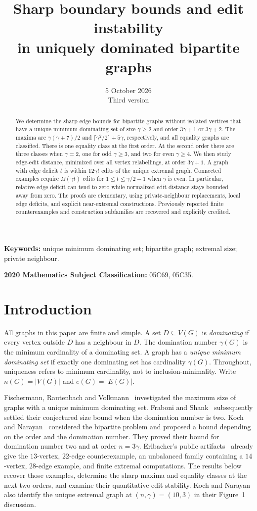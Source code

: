 \documentclass[11pt]{article}
\title{Sharp boundary bounds and edit instability\\in uniquely dominated bipartite graphs}
\author{}
\date{5 October 2026\\\small Third version}
\theoremstyle{definition}
\theoremstyle{remark}
\newcommand{\e}{e}
\begin{document}
\maketitle
\begin{abstract}
We determine the sharp edge bounds for bipartite graphs without isolated
vertices that have a unique minimum dominating set of size $\gamma\ge2$ and
order $3\gamma+1$ or $3\gamma+2$. The maxima are $\gamma(\gamma+7)/2$ and
$\lceil\gamma^2/2\rceil+5\gamma$, respectively, and all equality graphs are
classified. There is one equality class at the first order. At the second
order there are three classes when $\gamma=2$, one for odd $\gamma\ge3$,
and two for even $\gamma\ge4$.
We then study edge-edit distance, minimized over all vertex relabellings,
at order $3\gamma+1$. A graph with edge deficit $t$ is within $12\gamma t$
edits of the unique extremal graph. Connected examples require
$\Omega(\gamma t)$ edits for $1\le t\le\gamma/2-1$ when $\gamma$ is even.
In particular, relative edge deficit can tend to zero while normalized
edit distance stays bounded away from zero. The proofs are elementary,
using private-neighbour replacements, local edge deficits, and explicit
near-extremal constructions. Previously reported finite counterexamples
and construction subfamilies are recovered and explicitly credited.
\end{abstract}
\noindent\textbf{Keywords:} unique minimum dominating set; bipartite graph;
extremal size; private neighbour.
\par\smallskip
\noindent\textbf{2020 Mathematics Subject Classification:} 05C69, 05C35.

\section{Introduction}

All graphs in this paper are finite and simple. A set $D\subseteq V(G)$ is
\emph{dominating} if every vertex outside $D$ has a neighbour in $D$.
The domination number $\gamma(G)$ is the minimum cardinality of a dominating
set. A graph has a \emph{unique minimum dominating set} if exactly one dominating
set has cardinality $\gamma(G)$. Throughout, uniqueness refers to minimum
cardinality, not to inclusion-minimality. Write $n(G)=|V(G)|$ and
$\e(G)=|E(G)|$.

Fischermann, Rautenbach and Volkmann~\cite{FRV} investigated the maximum size
of graphs with a unique minimum dominating set. Fraboni and Shank~\cite{FS}
subsequently settled their conjectured size bound when the domination number
is two. Koch and Narayan~\cite{KN} considered the bipartite problem and proposed
a bound depending on the order and the domination number. They proved their
bound for domination number two and at order $n=3\gamma$.
Erlbacher's public artifacts~\cite{E} already give the $13$-vertex, $22$-edge
counterexample, an unbalanced family containing a $14$-vertex, $28$-edge
example, and finite extremal computations. The results below recover those
examples, determine the sharp maxima and equality classes at the next two
orders, and examine their quantitative edit stability.
Koch and Narayan also identify the unique extremal graph at
$(n,\gamma)=(10,3)$ in their Figure~1 discussion.
\end{document}

